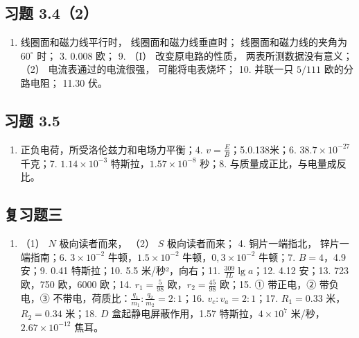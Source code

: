 \subsection{习题 3.4（2）}\label{ux4e60ux9898-3.42-1}

\begin{enumerate}
\def\labelenumi{\arabic{enumi}.}
\tightlist
\item
  线圈面和磁力线平行时， 线圈面和磁力线垂直时； 线圈面和磁力线的夹角为
  \(60^{\circ}\) 时； 3. 0.008 欧； 9. （I） 改变原电路的性质，
  两表所测数据没有意义； （2） 电流表通过的电流很强， 可能将电表烧坏；
  10. 并联一只 \(5 / 111\) 欧的分路电阻； 11.30 伏。
\end{enumerate}

\subsection{习题 3.5}\label{ux4e60ux9898-3.5-1}

\begin{enumerate}
\def\labelenumi{\arabic{enumi}.}
\setcounter{enumi}{2}
\tightlist
\item
  正负电荷，所受洛伦兹力和电场力平衡；4.
  \(v = \frac{E}{B}\)；5.0.138米；6. \(38.7 \times 10^{-27}\) 千克；7.
  \(1.14 \times 10^{-3}\) 特斯拉，\(1.57 \times 10^{-8}\) 秒；8.
  与质量成正比，与电量成反比。
\end{enumerate}

\subsection{复习题三}\label{ux590dux4e60ux9898ux4e09-1}

\begin{enumerate}
\def\labelenumi{\arabic{enumi}.}
\setcounter{enumi}{1}
\tightlist
\item
  （1） \(N\) 极向读者而来， （2） \(S\) 极向读者而来； 4.
  铜片一端指北， 锌片一端指南；6. \(3 \times 10^{-2}\)
  牛顿，\(1.5 \times 10^{-2}\) 牛顿，\(0, 3 \times 10^{-2}\) 牛顿；7.
  \(B = 4\)，4.9 安；9. 0.41 特斯拉；10. 5.5 米/秒²，向右；11.
  \(\frac{309}{IL} \lg a\)；12. 4.12 安；13. 723 欧，750 欧，6000
  欧；14. \(r_1 = \frac{5}{98}\) 欧，\(r_2 = \frac{45}{98}\) 欧；15. ①
  带正电，② 带负电，③
  不带电，荷质比：\(\frac{q_1}{m_1}: \frac{q_2}{m_2} = 2:1\)；16.
  \(v_c: v_a = 2:1\)；17. \(R_1 = 0.33\) 米，\(R_2 = 0.34\) 米；18.
  \(D\) 盒起静电屏蔽作用，1.57 特斯拉，\(4 \times 10^7\)
  米/秒，\(2.67 \times 10^{-12}\) 焦耳。
\end{enumerate}

